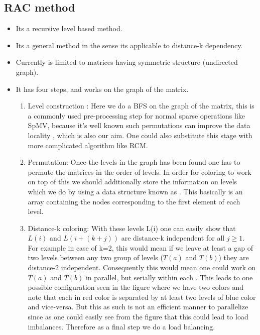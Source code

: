 \subsection{RAC method}
\begin{itemize}
	\item Its a recursive level based method. 
	\item Its a general method in the sense its applicable to distance-k dependency.
	\item Currently \RAC is limited to matrices having symmetric structure (undirected graph).
	\item It has four steps, and works on the graph of the matrix.
	\begin{enumerate}
		\item Level construction : Here we do a BFS\cite{BFS} on the graph of the matrix, this is a commonly used pre-processing step for normal sparse operations like SpMV, because it's well known such permutations can improve the data locality \cite{RCM_Sparse_computation}, which is also our aim. One could also substitute this stage with more complicated algorithm like RCM\cite{RCM}.
		
		\item Permutation: Once the levels in the graph has been found one has to permute the matrices in the order of levels. In order for coloring to work on top  of this we should additionally store the information on levels which we do by using a data structure known as \levelPtr. This basically is an array containing the nodes corresponding to  the first element of each level.
		
		\item Distance-k coloring: With these levels L(i) one can easily show that $L(i)$ and $L(i+(k+j))$ are distance-k independent for all $j\geq1$. For example in case of k=2, this would mean if we leave at least a gap of two levels between any two group of levels ($T(a)$ and $T(b)$) they are distance-2 independent. Consequently this would mean one could work on $T(a)$ and $T(b)$ in parallel, but serially within each \levelGroup. This leads to one possible configuration seen in the figure where we have two colors and note that each \levelGroup in red color is separated by at least two levels of blue  color and vice-versa. But this as such is not an efficient manner to parallelize since as one could easily see from the figure that this could lead to load imbalances. Therefore as a final step we do a load balancing.
		

\end{enumerate}
\end{itemize}
